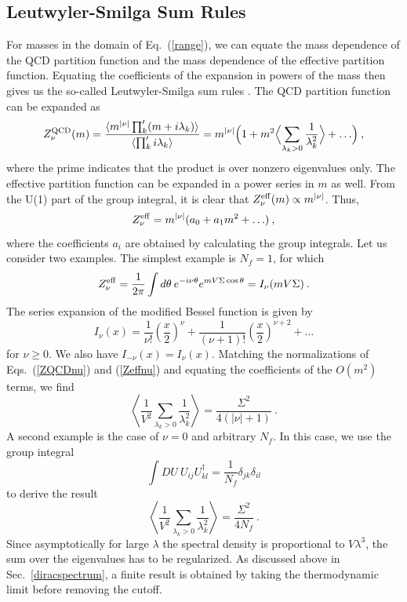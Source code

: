 \subsection{Leutwyler-Smilga Sum Rules}

For masses in the domain of Eq.~(\ref{range}), we can equate the mass
dependence of the QCD partition function and the mass dependence of
the effective partition function.  Equating the coefficients of the
expansion in powers of the mass then gives us the so-called
Leutwyler-Smilga sum rules \cite{Leut92}.  The QCD partition function
can be expanded as
\begin{equation}
  \label{ZQCDnu}
  {Z^{\rm QCD}_\nu(m)} = \frac {\langle 
    m^{|\nu|} \prod_k'(m+i\lambda_k) \rangle}
  {\langle\prod_k' i\lambda_k\rangle}
  = m^{|\nu|}\Bigl( 1 + m^2 \Bigl\langle\sum_{\lambda_k > 0 }\frac
    1{\lambda_k^2}\Bigr\rangle +\ldots\Bigr)\:, 
\end{equation}
where the prime indicates that the product is over nonzero eigenvalues
only.  The effective partition function can be expanded in a power
series in $m$ as well. {}From the U(1) part of the group integral, it
is clear that $Z_\nu^{\rm eff}(m) \propto m^{|\nu|}$. Thus,
\begin{equation}
  \label{Zeffnu}
  Z_\nu^{\rm eff}= m^{|\nu|}(a_0 + a_1 m^2 + \ldots)\:,
\end{equation}
where the coefficients $a_i$ are obtained by calculating the group
integrals. Let us consider two examples. The simplest example is $N_f
=1$, for which
\begin{equation}
  Z_\nu^{\rm eff} = \frac 1{2\pi}
  \int d\theta\: e^{-i\nu \theta} e^{mV \Sigma \cos \theta}
  =I_\nu(mV\Sigma)\:.
\end{equation}
The series expansion of the modified Bessel function is given by
\begin{equation}
  I_\nu(x) = \frac{1}{\nu!}\left (\frac x2\right )^\nu+ \frac 1{(\nu + 1)!} 
  \left (\frac x2\right )^{\nu+2} + \ldots 
\end{equation}
for $\nu\ge0$.  We also have $I_{-\nu}(x)=I_\nu(x)$.  Matching the
normalizations of Eqs.~(\ref{ZQCDnu}) and (\ref{Zeffnu}) and equating
the coefficients of the $O(m^2)$ terms, we find
\begin{equation}
   \left\langle\frac 1{V^2} \sum_{\lambda_k > 0} \frac
  1{\lambda_k^2}\right\rangle= \frac{\Sigma^2}{4(|\nu|+1)}\:.
\end{equation} 
A second example is the case of $\nu = 0$ and arbitrary $N_f$. In this
case, we use the group integral
\begin{equation}
  \int DU \:U_{ij} U^\dagger_{kl} = \frac 1{N_f} \delta_{jk} \delta_{il}
\end{equation}
to derive the result
\begin{equation}
  \left\langle\frac 1{V^2} \sum_{\lambda_k > 0}\frac
    1{\lambda_k^2}\right\rangle = \frac{\Sigma^2}{4N_f}\:.
\end{equation} 
Since asymptotically for large $\lambda$ the spectral density is
proportional to $V\lambda^3$, the sum over the eigenvalues has to be
regularized. As discussed above in Sec.~\ref{diracspectrum}, a
finite result is obtained by taking the thermodynamic limit before
removing the cutoff.

